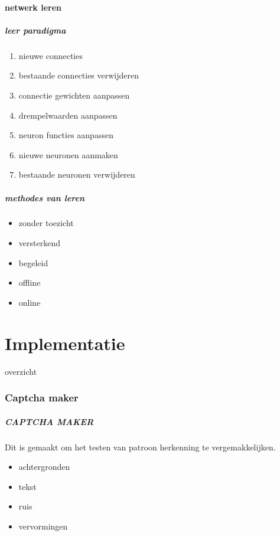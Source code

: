 \documentclass{beamer}
\newcommand{\partTOC}{%
  \begin{frame}{overzicht}%
  \tableofcontents[currentpart]%
  \end{frame}%
}
\begin{document}
\subsection{netwerk leren}
\begin{frame}
  \frametitle{leer paradigma}
  \begin{enumerate}
    \item nieuwe connecties
    \item bestaande connecties verwijderen
    \item connectie gewichten aanpassen
    \item drempelwaarden aanpassen
    \item neuron functies aanpassen
    \item nieuwe neuronen aanmaken
    \item bestaande neuronen verwijderen
  \end{enumerate}
\end{frame}
\begin{frame}
  \frametitle{methodes van leren}
  \begin{itemize}
    \item zonder toezicht
    \item versterkend
    \item begeleid
  \end{itemize}
  \vfill
  \begin{itemize}
    \item offline
    \item online
  \end{itemize}
\end{frame}
\part{Implementatie}
\partTOC
\section{Captcha maker}
\begin{frame}
  \frametitle{CAPTCHA MAKER}
  Dit is gemaakt om het testen van patroon herkenning te vergemakkelijken.
  \begin{itemize}
    \item achtergronden
    \item tekst
    \item ruis
    \item vervormingen
  \end{itemize}
\end{frame}
\end{document}
